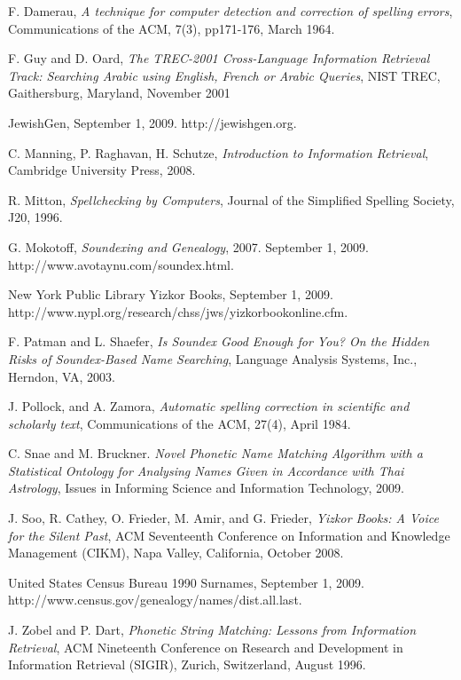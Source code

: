 \documentclass{endm}
\begin{document}
\begin{CJK}{UTF8}{song}
\begin{thebibliography}{1}
 F. Damerau, {\em A technique for computer detection and correction of spelling errors}, Communications of the ACM, 7(3), pp171-176, March 1964.

 F. Guy and D. Oard, {\em The TREC-2001 Cross-Language Information Retrieval Track: Searching Arabic using English, French or Arabic Queries}, NIST TREC, Gaithersburg, Maryland, November 2001

 JewishGen, September 1, 2009. http://jewishgen.org.

 C. Manning, P. Raghavan, H. Schutze, {\em Introduction to Information Retrieval}, Cambridge University Press, 2008.

 R. Mitton, {\em Spellchecking by Computers}, Journal of the Simplified Spelling Society, J20, 1996. 

 G. Mokotoff, {\em Soundexing and Genealogy}, 2007.  September 1, 2009. http://www.avotaynu.com/soundex.html.

 New York Public Library Yizkor Books, September 1, 2009.  http://www.nypl.org/research/chss/jws/yizkorbookonline.cfm.

 F. Patman and L. Shaefer, {\em Is Soundex Good Enough for You?  On the Hidden Risks of Soundex-Based Name Searching}, Language Analysis Systems, Inc., Herndon, VA, 2003.

J. Pollock, and A. Zamora, {\em Automatic spelling correction in scientific and scholarly text}, Communications of the ACM, 27(4), April 1984.

 C. Snae and M. Bruckner.  {\em Novel Phonetic Name Matching Algorithm with a Statistical Ontology for Analysing Names Given in Accordance with Thai Astrology}, Issues in Informing Science and Information Technology, 2009.

 J. Soo, R. Cathey, O. Frieder, M. Amir, and G. Frieder, {\em Yizkor Books: A Voice for the Silent Past}, ACM Seventeenth Conference on Information and Knowledge Management (CIKM), Napa Valley, California, October 2008.

 United States Census Bureau 1990 Surnames, September 1, 2009.  http://www.census.gov/genealogy/names/dist.all.last.

 J. Zobel and P. Dart, {\em Phonetic String Matching: Lessons from Information Retrieval}, ACM Nineteenth Conference on Research and Development in Information Retrieval (SIGIR), Zurich, Switzerland, August 1996.

\end{thebibliography}


\end{CJK}
\end{document}
